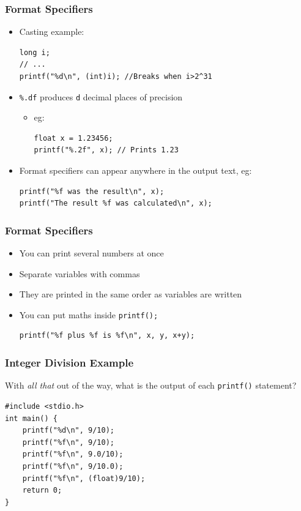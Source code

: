 \documentclass[14pt]{beamer}
\begin{document}
\begin{frame}[fragile]
\frametitle{Format Specifiers}
\begin{itemize}
\item Casting example:
\begin{lstlisting}[style=CStyle]
long i;
// ...
printf("%d\n", (int)i); //Breaks when i>2^31
\end{lstlisting}
\item \texttt{\%.df} produces \texttt{d} decimal places of precision
	\begin{itemize}
		\item eg: \\
		\begin{lstlisting}[style=CStyle]
float x = 1.23456;
printf("%.2f", x); // Prints 1.23
\end{lstlisting}
	\end{itemize}

\item Format specifiers can appear anywhere in the output text, eg:
\begin{lstlisting}[style=CStyle]
printf("%f was the result\n", x);
printf("The result %f was calculated\n", x);
\end{lstlisting}
\end{itemize}
\end{frame}

\begin{frame}[fragile]
\frametitle{Format Specifiers}
\begin{itemize}
\item You can print several numbers at once
\item Separate variables with commas
\item They are printed in the same order as variables are written
\item You can put maths inside \texttt{printf();}
\begin{lstlisting}[style=CStyle]
printf("%f plus %f is %f\n", x, y, x+y);
\end{lstlisting}
\end{itemize}
\end{frame}

\begin{frame}[fragile]
\frametitle{Integer Division Example}
With \textit{all that} out of the way, what is the output of each \texttt{printf()} statement?
\begin{lstlisting}[style=CStyle,caption=\texttt{intdiv.c}]
#include <stdio.h>
int main() {
	printf("%d\n", 9/10);
	printf("%f\n", 9/10);
	printf("%f\n", 9.0/10);
	printf("%f\n", 9/10.0);
	printf("%f\n", (float)9/10);
	return 0;
}
\end{lstlisting}
\end{frame}
\end{document}
